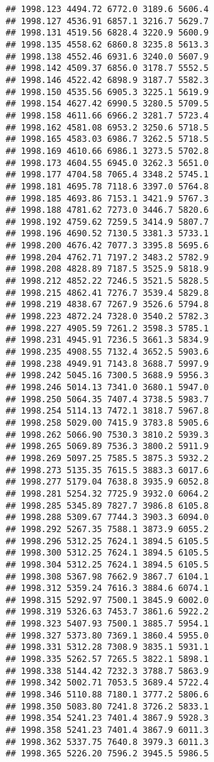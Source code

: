 \documentclass[
]{article}
\begin{document}
\begin{verbatim}
## 1998.123 4494.72 6772.0 3189.6 5606.4
## 1998.127 4536.91 6857.1 3216.7 5629.7
## 1998.131 4519.56 6828.4 3220.9 5600.9
## 1998.135 4558.62 6860.8 3235.8 5613.3
## 1998.138 4552.46 6931.6 3240.0 5607.9
## 1998.142 4509.37 6856.0 3178.7 5552.5
## 1998.146 4522.42 6898.9 3187.7 5582.3
## 1998.150 4535.56 6905.3 3225.1 5619.9
## 1998.154 4627.42 6990.5 3280.5 5709.5
## 1998.158 4611.66 6966.2 3281.7 5723.4
## 1998.162 4581.08 6953.2 3250.6 5718.5
## 1998.165 4583.03 6986.7 3262.5 5718.5
## 1998.169 4610.66 6986.1 3273.5 5702.8
## 1998.173 4604.55 6945.0 3262.3 5651.0
## 1998.177 4704.58 7065.4 3348.2 5745.1
## 1998.181 4695.78 7118.6 3397.0 5764.8
## 1998.185 4693.86 7153.1 3421.9 5767.3
## 1998.188 4781.62 7273.0 3446.7 5820.6
## 1998.192 4759.62 7259.5 3414.9 5807.7
## 1998.196 4690.52 7130.5 3381.3 5733.1
## 1998.200 4676.42 7077.3 3395.8 5695.6
## 1998.204 4762.71 7197.2 3483.2 5782.9
## 1998.208 4828.89 7187.5 3525.9 5818.9
## 1998.212 4852.22 7246.5 3521.5 5828.5
## 1998.215 4862.41 7276.7 3539.4 5829.8
## 1998.219 4838.67 7267.9 3526.6 5794.8
## 1998.223 4872.24 7328.0 3540.2 5782.3
## 1998.227 4905.59 7261.2 3598.3 5785.1
## 1998.231 4945.91 7236.5 3661.3 5834.9
## 1998.235 4908.55 7132.4 3652.5 5903.6
## 1998.238 4949.91 7143.8 3688.7 5997.9
## 1998.242 5045.16 7300.5 3688.9 5956.3
## 1998.246 5014.13 7341.0 3680.1 5947.0
## 1998.250 5064.35 7407.4 3738.5 5983.7
## 1998.254 5114.13 7472.1 3818.7 5967.8
## 1998.258 5029.00 7415.9 3783.8 5905.6
## 1998.262 5066.90 7530.3 3810.2 5939.3
## 1998.265 5069.89 7536.3 3800.2 5911.9
## 1998.269 5097.25 7585.5 3875.3 5932.2
## 1998.273 5135.35 7615.5 3883.3 6017.6
## 1998.277 5179.04 7638.8 3935.9 6052.8
## 1998.281 5254.32 7725.9 3932.0 6064.2
## 1998.285 5345.89 7827.7 3986.8 6105.8
## 1998.288 5309.67 7744.3 3903.3 6094.0
## 1998.292 5267.35 7588.1 3873.9 6055.2
## 1998.296 5312.25 7624.1 3894.5 6105.5
## 1998.300 5312.25 7624.1 3894.5 6105.5
## 1998.304 5312.25 7624.1 3894.5 6105.5
## 1998.308 5367.98 7662.9 3867.7 6104.1
## 1998.312 5359.24 7616.3 3884.6 6074.1
## 1998.315 5292.97 7500.1 3845.9 6002.0
## 1998.319 5326.63 7453.7 3861.6 5922.2
## 1998.323 5407.93 7500.1 3885.7 5954.1
## 1998.327 5373.80 7369.1 3860.4 5955.0
## 1998.331 5312.28 7308.9 3835.1 5931.1
## 1998.335 5262.57 7265.5 3822.1 5898.1
## 1998.338 5144.42 7232.3 3788.7 5863.9
## 1998.342 5002.71 7053.5 3689.4 5722.4
## 1998.346 5110.88 7180.1 3777.2 5806.6
## 1998.350 5083.80 7241.8 3726.2 5833.1
## 1998.354 5241.23 7401.4 3867.9 5928.3
## 1998.358 5241.23 7401.4 3867.9 6011.3
## 1998.362 5337.75 7640.8 3979.3 6011.3
## 1998.365 5226.20 7596.2 3945.5 5986.5

\end{verbatim}
\end{document}
